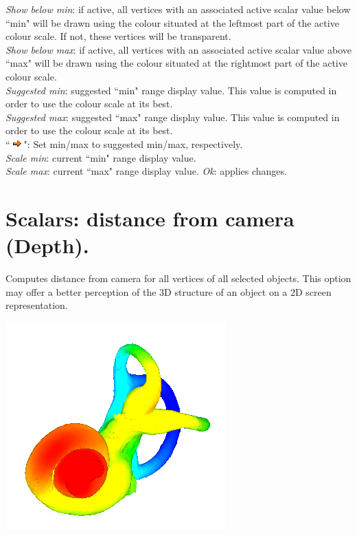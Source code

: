 \textit{Show below min}: if active, all vertices with an associated active scalar value below ``min" will be drawn using the colour situated at the leftmost part of the active colour scale. If not, these vertices will be transparent.\\
\textit{Show below max}: if active, all vertices with an associated active scalar value above ``max" will be drawn using the colour situated at the rightmost part of the active colour scale.\\
\textit{Suggested min}: suggested ``min" range display value. This value is computed in order to use the
colour scale at its best.\\
\textit{Suggested max}: suggested ``max" range display value. This value is computed in order to use the
colour scale at its best.\\
``\includegraphics[scale=0.7]{images/pixmap/s_right_132.png}": Set min/max to suggested min/max, respectively.\\
\textit{Scale min}: current ``min" range display value.\\
\textit{Scale max}: current ``max" range display value.
\textit{Ok}: applies changes.


\section{Scalars: distance from camera (Depth).}
\noindent
\begin{minipage}{0.5\textwidth}
Computes distance from camera for all vertices of
all selected objects. This option may offer a better
perception of the 3D structure of an object on a
2D screen representation.
\end{minipage}    
\begin{minipage}{0.5\textwidth}\centering
  \includegraphics[scale=0.5]{images/Scalars_renreding/Depth.png}
\label{depth_scalar}
 \end{minipage} 
\noindent



